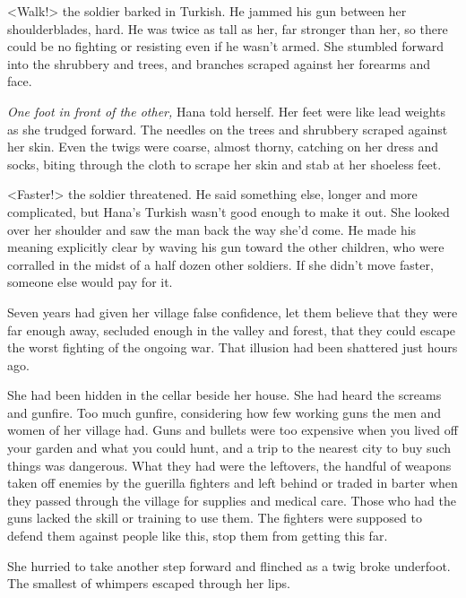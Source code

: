 
<Walk!> the soldier barked in Turkish.  He jammed his gun between her shoulderblades, hard.  He was twice as tall as her, far stronger than her, so there could be no fighting or resisting even if he wasn't armed.  She stumbled forward into the shrubbery and trees, and branches scraped against her forearms and face.



\emph{One foot in front of the other, }Hana told herself.  Her feet were like lead weights as she trudged forward.  The needles on the trees and shrubbery scraped against her skin.  Even the twigs were coarse, almost thorny, catching on her dress and socks, biting through the cloth to scrape her skin and stab at her shoeless feet.



<Faster!> the soldier threatened.  He said something else, longer and more complicated, but Hana's Turkish wasn't good enough to make it out.  She looked over her shoulder and saw the man back the way she'd come.  He made his meaning explicitly clear by waving his gun toward the other children, who were corralled in the midst of a half dozen other soldiers.  If she didn't move faster, someone else would pay for it.



Seven years had given her village false confidence, let them believe that they were far enough away, secluded enough in the valley and forest, that they could escape the worst fighting of the ongoing war.  That illusion had been shattered just hours ago.



She had been hidden in the cellar beside her house.  She had heard the screams and gunfire.  Too much gunfire, considering how few working guns the men and women of her village had.  Guns and bullets were too expensive when you lived off your garden and what you could hunt, and a trip to the nearest city to buy such things was dangerous.  What they had were the leftovers, the handful of weapons taken off enemies by the guerilla fighters and left behind or traded in barter when they passed through the village for supplies and medical care.  Those who had the guns lacked the skill or training to use them.  The fighters were supposed to defend them against people like this, stop them from getting this far.



She hurried to take another step forward and flinched as a twig broke underfoot.  The smallest of whimpers escaped through her lips.




